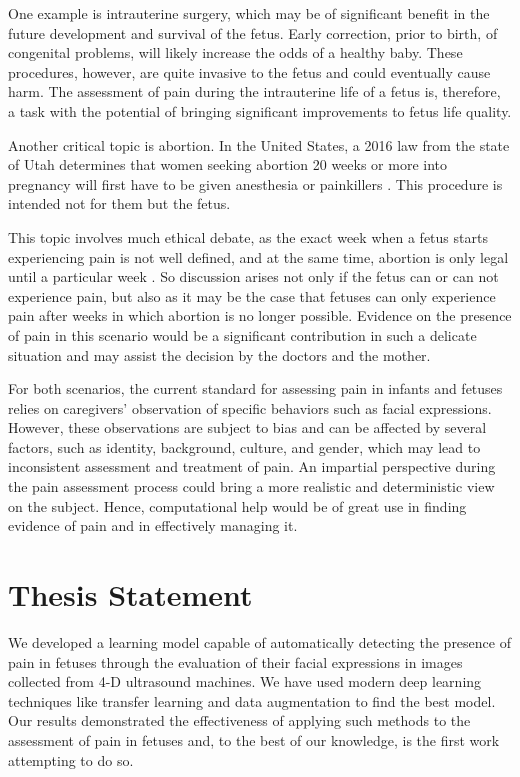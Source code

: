 One example is intrauterine surgery, which may be of significant benefit in the future development and survival of the fetus. Early correction, prior to birth, of congenital problems, will likely increase the odds of a healthy baby. These procedures, however, are quite invasive to the fetus and could eventually cause harm. The assessment of pain during the intrauterine life of a fetus is, therefore, a task with the potential of bringing significant improvements to fetus life quality. 

Another critical topic is abortion. In the United States, a 2016 law from the state of Utah determines that women seeking abortion 20 weeks or more into pregnancy will first have to be given anesthesia or painkillers \citep{healy2016nytimes}. This procedure is intended not for them but the fetus. 

This topic involves much ethical debate, as the exact week when a fetus starts experiencing pain is not well defined, and at the same time, abortion is only legal until a particular week \citep{Derbyshire2006}. So discussion arises not only if the fetus can or can not experience pain, but also as it may be the case that fetuses can only experience pain after weeks in which abortion is no longer possible. Evidence on the presence of pain in this scenario would be a significant contribution in such a delicate situation and may assist the decision by the doctors and the mother.

For both scenarios, the current standard for assessing pain in infants and fetuses relies on caregivers' observation of specific behaviors such as facial expressions. However, these observations are subject to bias and can be affected by several factors, such as identity, background, culture, and gender, which may lead to inconsistent assessment and treatment of pain. An impartial perspective during the pain assessment process could bring a more realistic and deterministic view on the subject. Hence, computational help would be of great use in finding evidence of pain and in effectively managing it.

\section{Thesis Statement}

We developed a learning model capable of automatically detecting the presence of pain in fetuses through the evaluation of their facial expressions in images collected from 4-D ultrasound machines. We have used modern deep learning techniques like transfer learning and data augmentation to find the best model. Our results demonstrated the effectiveness of applying such methods to the assessment of pain in fetuses and, to the best of our knowledge, is the first work attempting to do so.

